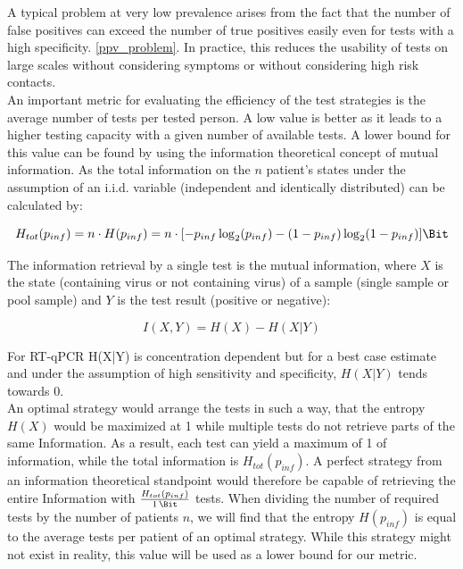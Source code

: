 \documentclass[fleqn,10pt]{wlscirep}
\begin{document}
A typical problem at very low prevalence arises from the fact that the number of false positives can exceed the number of true positives easily even for tests with a high specificity. \ref{ppv_problem}. In practice, this reduces the usability of tests on large scales without considering symptoms or without considering high risk contacts.\\

An important metric for evaluating the efficiency of the test strategies is the average number of tests per tested person. A low value is better as it leads to a higher testing capacity with a given number of available tests. A lower bound for this value can be found by using the information theoretical concept of mutual information. As the total information on the $n$ patient’s states under the assumption of an i.i.d. variable (independent and identically distributed) can be calculated by:

\begin{ceqn}
	\begin{equation}
	H_{tot}(p_{inf}) = n \cdot H(p_{inf}) = n \cdot [-p_{inf} \log_2(p_{inf}) - (1-p_{inf}) \log_2(1 - p_{inf})] \si{\Bit}
	\end{equation}
\end{ceqn}

The information retrieval by a single test is the mutual information, where $X$ is the state (containing virus or not containing virus) of a sample (single sample or pool sample) and $Y$ is the test result (positive or negative):
\begin{ceqn}
\begin{equation}
I(X,Y) = H(X) - H(X|Y)
\end{equation}
\end{ceqn}
For RT-qPCR H(X|Y) is concentration dependent but for a best case estimate and under the assumption of high sensitivity and specificity, $H(X|Y)$ tends towards $0$. \\

An optimal strategy would arrange the tests in such a way, that the entropy $H(X)$ would be maximized at \SI{1}{\Bit} while multiple tests do not retrieve parts of the same Information. As a result, each test can yield a maximum of \SI{1}{\Bit} of information, while the total information is $H_{tot}(p_{inf})$. A perfect strategy from an information theoretical standpoint would therefore be capable of retrieving the entire Information with $\frac{H_{tot}(p_{inf})}{\SI{1}{\Bit}}$ tests. When dividing the number of required tests by the number of patients $n$, we will find that the entropy $H(p_{inf})$ is equal to the average tests per patient of an optimal strategy. While this strategy might not exist in reality, this value will be used as a lower bound for our metric.\\
\end{document}

